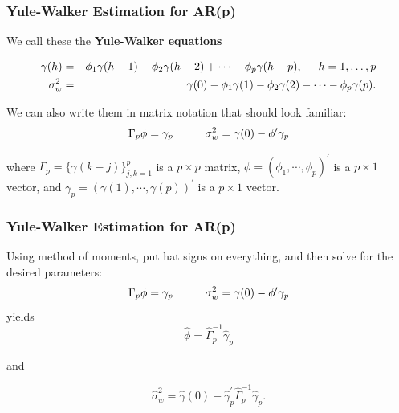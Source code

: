 \documentclass[%
xcolor=pdftex]{beamer}
\begin{document}
\begin{frame}
\frametitle{Yule-Walker Estimation for AR(p)}

We call these the \textbf{Yule-Walker equations}

\begin{eqnarray*}
\gamma(h) &=&  \phi_1 \gamma(h-1) + \phi_2 \gamma(h-2) + \cdots + \phi_p \gamma(h-p), \hspace{5mm} h=1,\ldots,p  \\
\sigma_{w}^2 &=& \gamma(0) - \phi_1 \gamma(1) - \phi_2 \gamma(2) - \cdots - \phi_p \gamma(p).
\end{eqnarray*}

We can also write them in matrix notation that should look familiar:
$$
\Gamma_p \phi = \gamma_p \hspace{10mm} \sigma^2_w = \gamma(0) - \phi' \gamma_p
$$

where $\Gamma_p = \{\gamma(k-j) \}_{j,k=1}^p$ is a $p \times p$ matrix, $\phi = (\phi_1, \cdots, \phi_p)^{\prime}$ is a $p \times 1$ vector, and $\gamma_p = (\gamma(1), \cdots, \gamma(p))^{\prime}$ is a $p \times 1$ vector.


\end{frame}


\begin{frame}
\frametitle{Yule-Walker Estimation for AR(p)}

Using method of moments, put hat signs on everything, and then solve for the desired parameters:
$$
\Gamma_p \phi = \gamma_p \hspace{10mm} \sigma^2_w = \gamma(0) - \phi' \gamma_p
$$
yields
\begin{equation*}
\hat{\phi} = \hat{\Gamma}_p^{-1} \hat{\gamma}_p
\end{equation*}

and

\begin{equation*}
\hat{\sigma}_w^2 = \hat{\gamma}(0) - \hat{\gamma}_p^{\prime} \hat{\Gamma}_p^{-1} \hat{\gamma}_p.
\end{equation*}

\end{frame}
\end{document}
